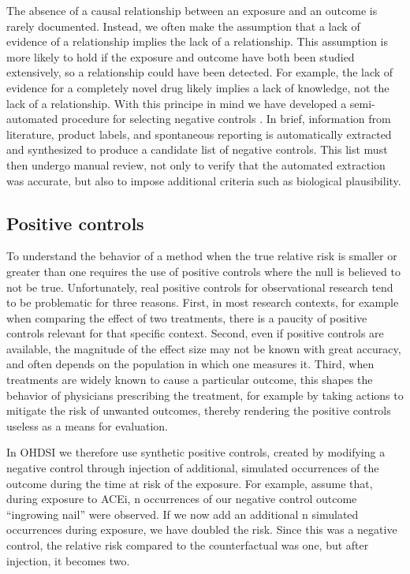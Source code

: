 \documentclass[11pt]{book}
\theoremstyle{definition}
\theoremstyle{definition}
\theoremstyle{definition}
\theoremstyle{remark}
\begin{document}
The absence of a causal relationship between an exposure and an outcome is rarely documented. Instead, we often make the assumption that a lack of evidence of a relationship implies the lack of a relationship. This assumption is more likely to hold if the exposure and outcome have both been studied extensively, so a relationship could have been detected. For example, the lack of evidence for a completely novel drug likely implies a lack of knowledge, not the lack of a relationship. With this principe in mind we have developed a semi-automated procedure for selecting negative controls \citep{voss_2016}. In brief, information from literature, product labels, and spontaneous reporting is automatically extracted and synthesized to produce a candidate list of negative controls. This list must then undergo manual review, not only to verify that the automated extraction was accurate, but also to impose additional criteria such as biological plausibility.

\hypertarget{PositiveControls}{%
\subsection{Positive controls}\label{PositiveControls}}

To understand the behavior of a method when the true relative risk is smaller or greater than one requires the use of positive controls where the null is believed to not be true. Unfortunately, real positive controls for observational research tend to be problematic for three reasons. First, in most research contexts, for example when comparing the effect of two treatments, there is a paucity of positive controls relevant for that specific context. Second, even if positive controls are available, the magnitude of the effect size may not be known with great accuracy, and often depends on the population in which one measures it. Third, when treatments are widely known to cause a particular outcome, this shapes the behavior of physicians prescribing the treatment, for example by taking actions to mitigate the risk of unwanted outcomes, thereby rendering the positive controls useless as a means for evaluation. \citep{noren_2014}

In OHDSI we therefore use synthetic positive controls, \citep{schuemie_2018} created by modifying a negative control through injection of additional, simulated occurrences of the outcome during the time at risk of the exposure. For example, assume that, during exposure to ACEi, n occurrences of our negative control outcome ``ingrowing nail'' were observed. If we now add an additional n simulated occurrences during exposure, we have doubled the risk. Since this was a negative control, the relative risk compared to the counterfactual was one, but after injection, it becomes two.
\end{document}
